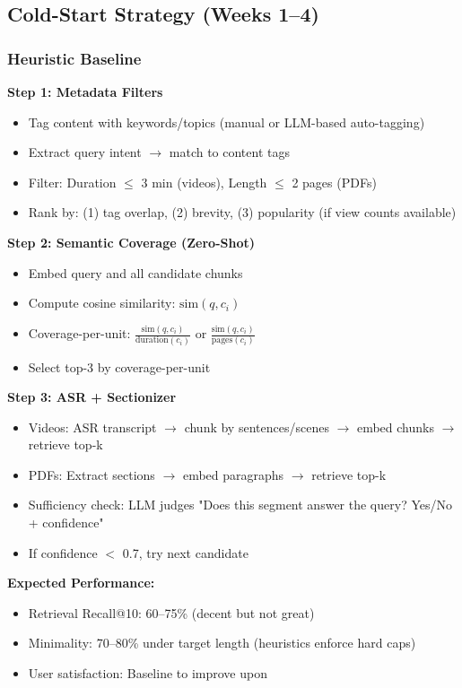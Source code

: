 \documentclass[11pt,letterpaper]{article}
\begin{document}
\subsection{Cold-Start Strategy (Weeks 1--4)}

\subsubsection{Heuristic Baseline}

\textbf{Step 1: Metadata Filters}
\begin{itemize}
\item Tag content with keywords/topics (manual or LLM-based auto-tagging)
\item Extract query intent $\rightarrow$ match to content tags
\item Filter: Duration $\leq$ 3 min (videos), Length $\leq$ 2 pages (PDFs)
\item Rank by: (1) tag overlap, (2) brevity, (3) popularity (if view counts available)
\end{itemize}

\textbf{Step 2: Semantic Coverage (Zero-Shot)}
\begin{itemize}
\item Embed query and all candidate chunks
\item Compute cosine similarity: $\text{sim}(q, c_i)$
\item Coverage-per-unit: $\frac{\text{sim}(q, c_i)}{\text{duration}(c_i)}$ or $\frac{\text{sim}(q, c_i)}{\text{pages}(c_i)}$
\item Select top-3 by coverage-per-unit
\end{itemize}

\textbf{Step 3: ASR + Sectionizer}
\begin{itemize}
\item Videos: ASR transcript $\rightarrow$ chunk by sentences/scenes $\rightarrow$ embed chunks $\rightarrow$ retrieve top-k
\item PDFs: Extract sections $\rightarrow$ embed paragraphs $\rightarrow$ retrieve top-k
\item Sufficiency check: LLM judges "Does this segment answer the query? Yes/No + confidence"
\item If confidence $<$ 0.7, try next candidate
\end{itemize}

\textbf{Expected Performance:}
\begin{itemize}
\item Retrieval Recall@10: 60--75\% (decent but not great)
\item Minimality: 70--80\% under target length (heuristics enforce hard caps)
\item User satisfaction: Baseline to improve upon
\end{itemize}
\end{document}
